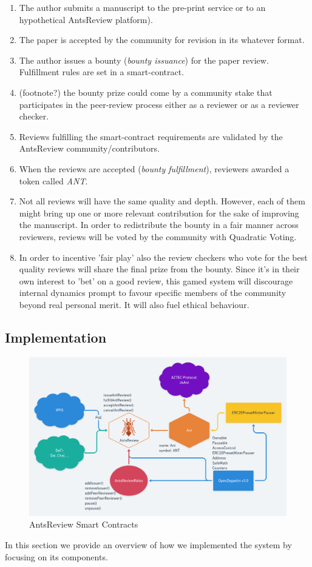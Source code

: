 \documentclass[runningheads]{llncs}
\begin{document}
\begin{enumerate}
    \item The author submits a manuscript to the pre-print service or to an hypothetical AntsReview platform).
    \item The paper is accepted by the community for revision in its whatever format.
    \item The author issues a bounty (\emph{bounty issuance}) for the paper review. Fulfillment rules are set in a smart-contract.
    \item (footnote?) the bounty prize could come by a community stake that participates in the peer-review process either as a reviewer or as a reviewer checker.
    \item Reviews fulfilling the smart-contract requirements are validated by the AntsReview community/contributors.
    \item When the reviews are accepted (\emph{bounty fulfillment}), reviewers awarded a token called \emph{ANT}.
    \item Not all reviews will have the same quality and depth. However, each of them might bring up one or more relevant contribution for the sake of improving the manuscript. In order to redistribute the bounty in a fair manner across reviewers, reviews will be voted by the community with Quadratic Voting.
    \item In order to incentive 'fair play' also the review checkers who vote for the best quality reviews will share the final prize from the bounty. Since it's in their own interest to 'bet' on a good review, this gamed system will discourage internal dynamics prompt to favour specific members of the community beyond real personal merit. It will also fuel ethical behaviour.

 \end{enumerate}

\subsection{Implementation}

\begin{figure}
\centering
\includegraphics[scale=0.28]{AntsReview}
\caption{AntsReview Smart Contracts}
\label{fig:contracts}
\end{figure}
In this section we provide an overview of how we implemented the system by focusing on its components.
\end{document}
